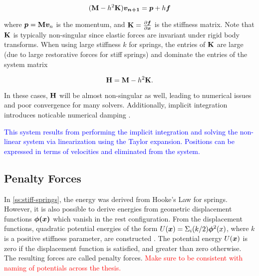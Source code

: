 \[
    (\mathbf{M} - h^2\mathbf{K})\bm{v_{n+1}} = \bm{p} + h\bm{f}
\]

where $\bm{p} = \mathbf{M}\bm{v}_n$ is the momentum, and $\mathbf{K} = \frac{\partial \bm{f}}{\partial \bm{x}}$ is the 
stiffness matrix. Note that 
$\mathbf{K}$ is typically non-singular since elastic forces are invariant under rigid body transforms. When using large stiffness 
$k$ for springs, the entries of $\mathbf{K}$ are large (due to large restorative forces for stiff springs) and dominate the entries 
of the system matrix 

\begin{equation}\label{eq:system-H}
    \mathbf{H} = \mathbf{M} - h^2\mathbf{K}.
\end{equation}

In these cases, $\mathbf{H}$ will be almost non-singular as well, leading to numerical issues and poor convergence for many solvers. 
Additionally, implicit integration introduces noticable numerical damping \cite{servin2006}.

\textcolor{blue}{This system results from performing the implicit integration and solving the non-linear system via linearization
using the Taylor expansion. Positions can be expressed in terms of velocities and eliminated from the system.}

\subsection{Penalty Forces}\label{ss:penalty-forces}
In \cref{ss:stiff-springs}, the energy was derived from Hooke's Law for springs. However, it is also possible to derive energies from 
geometric displacement functions $\bm{\phi(x)}$ which vanish in the rest configuration. From the displacement functions, quadratic 
potential energies of the form $U(\bm{x}) = \Sigma_i (k / 2) \bm{\phi}^2(x)$, where $k$ is a positive stiffness parameter, are 
constructed \cite{terz1987}. The potential energy $U(\bm{x})$ is zero if the displacement function is satisfied, and greater than 
zero otherwise. The resulting forces are called penalty forces. \textcolor{red}{Make sure to be consistent with naming of potentials
across the thesis.}

